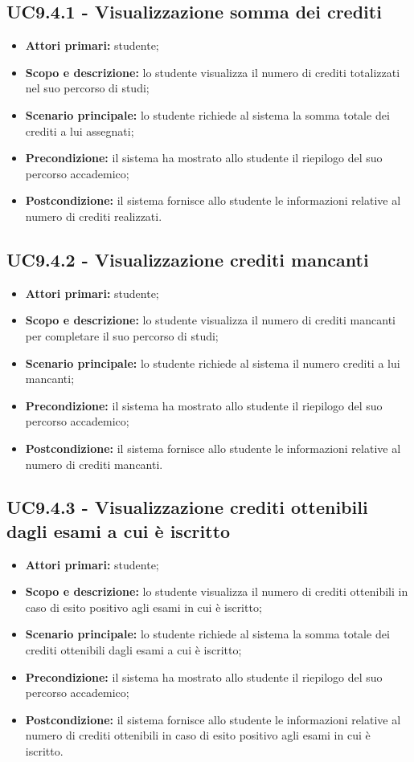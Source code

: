 \documentclass[AnalisiDeiRequisiti.tex]{subfiles}
\begin{document}
\subsection{UC9.4.1 - Visualizzazione somma dei crediti}
\begin{itemize}
	\item \textbf{Attori primari:} studente;
	\item \textbf{Scopo e descrizione:} lo studente visualizza il numero di crediti totalizzati nel suo percorso di studi;
	\item \textbf{Scenario principale:} lo studente richiede al sistema la somma totale dei crediti a lui assegnati;
	\item \textbf{Precondizione:} il sistema ha mostrato allo studente il riepilogo del suo percorso accademico;
	\item \textbf{Postcondizione:} il sistema fornisce allo studente le informazioni relative al numero di crediti realizzati.
\end{itemize}
\subsection{UC9.4.2 - Visualizzazione crediti mancanti}
\begin{itemize}
	\item \textbf{Attori primari:} studente;
	\item \textbf{Scopo e descrizione:} lo studente visualizza il numero di crediti mancanti per completare il suo percorso di studi;
	\item \textbf{Scenario principale:} lo studente richiede al sistema il numero crediti a lui mancanti;
	\item \textbf{Precondizione:} il sistema ha mostrato allo studente il riepilogo del suo percorso accademico;
	\item \textbf{Postcondizione:} il sistema fornisce allo studente le informazioni relative al numero di crediti mancanti.
\end{itemize}
\subsection{UC9.4.3 - Visualizzazione crediti ottenibili dagli esami a cui è iscritto}
\begin{itemize}
	\item \textbf{Attori primari:} studente;
	\item \textbf{Scopo e descrizione:} lo studente visualizza il numero di crediti ottenibili in caso di esito positivo agli esami in cui è iscritto;
	\item \textbf{Scenario principale:} lo studente richiede al sistema la somma totale dei crediti ottenibili dagli esami a cui è iscritto;
	\item \textbf{Precondizione:} il sistema ha mostrato allo studente il riepilogo del suo percorso accademico;
	\item \textbf{Postcondizione:} il sistema fornisce allo studente le informazioni relative al numero di crediti ottenibili in caso di esito positivo agli esami in cui è iscritto.
\end{itemize}
\end{document}
